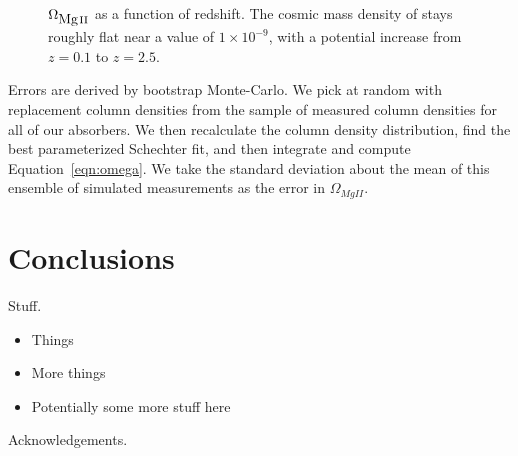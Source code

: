 \documentclass[iop,apj,numberedappendix,appendixfloats,twocolappendix]{emulateapj}
\begin{document}
\begin{figure*}[bth]
\caption{$\Omega_{\hbox{{\rm Mg}\kern 0.1em{\sc ii}}}$ as a function of redshift. The cosmic mass density of {\MgII} stays roughly flat near a value of $1 \times 10^{-9}$, with a potential increase from $z = 0.1$ to $z = 2.5$.}
\label{fig:omegamgii}
\end{figure*}

Errors are derived by bootstrap Monte-Carlo. We pick at random with replacement column densities from the sample of measured column densities for all of our {\MgII} absorbers. We then recalculate the column density distribution, find the best parameterized Schechter fit, and then integrate and compute Equation~\ref{eqn:omega}. We take the standard deviation about the mean of this ensemble of simulated measurements as the error in $\Omega_{MgII}$. 

\section{Conclusions}
\label{sec:conclusions}

Stuff.

\begin{itemize}
\item Things
\item More things
\item Potentially some more stuff here
\end{itemize}

Acknowledgements.



\end{document}
